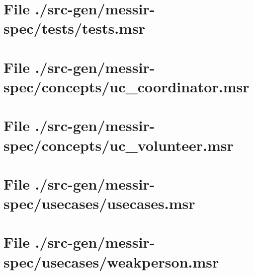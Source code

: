 \section[File /src-gen/messir-spec/tests/tests.msr]{File ./src-gen/messir-spec/tests/tests.msr}
\scriptsize

\normalsize
	
\section[File /src-gen/messir-spec/concepts/uc_coordinator.msr]{File ./src-gen/messir-spec/concepts/uc_coordinator.msr}
\scriptsize

\normalsize
	
\section[File /src-gen/messir-spec/concepts/uc_volunteer.msr]{File ./src-gen/messir-spec/concepts/uc_volunteer.msr}
\scriptsize

\normalsize
	
\section[File /src-gen/messir-spec/usecases/usecases.msr]{File ./src-gen/messir-spec/usecases/usecases.msr}
\scriptsize

\normalsize
	
\section[File /src-gen/messir-spec/usecases/weakperson.msr]{File ./src-gen/messir-spec/usecases/weakperson.msr}
\scriptsize

\normalsize
	
